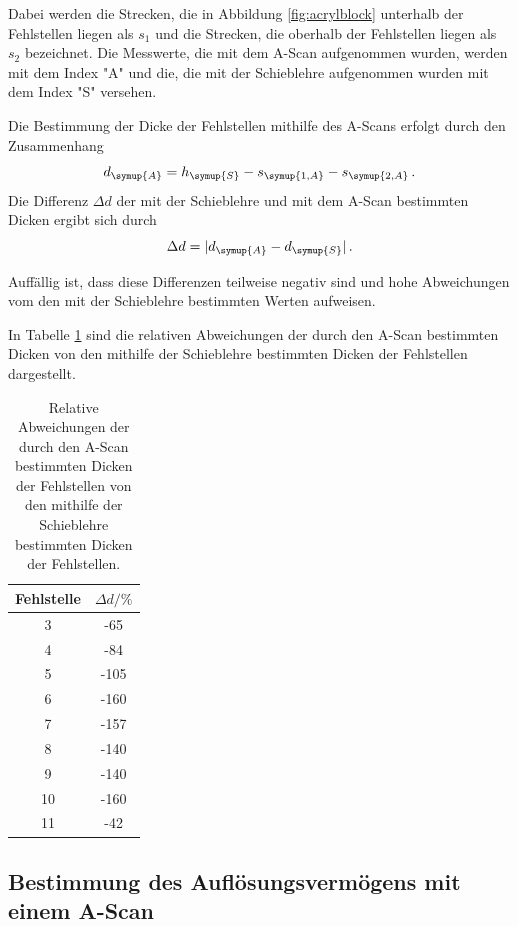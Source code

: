 Dabei werden die Strecken, die in Abbildung \ref{fig:acrylblock} unterhalb der Fehlstellen liegen
als $s_1$ und die Strecken, die oberhalb der Fehlstellen liegen als $s_2$ bezeichnet.
Die Messwerte, die mit dem A-Scan aufgenommen wurden, werden mit dem Index "A"
und die, die mit der Schieblehre aufgenommen wurden mit dem Index "S" versehen.

Die Bestimmung der Dicke der Fehlstellen mithilfe des A-Scans erfolgt durch den
Zusammenhang
\begin{equation}
  d_{\symup{A}}=h_{\symup{S}}-s_{\symup{1,A}}-s_{\symup{2,A}} \,.
\end{equation}
Die Differenz $\Delta d$ der mit der Schieblehre und mit dem A-Scan bestimmten
Dicken ergibt sich durch
\begin{equation}
  \Delta d=|d_{\symup{A}}-d_{\symup{S}}| \,.
\end{equation}

Auffällig ist, dass diese Differenzen teilweise negativ sind und hohe Abweichungen
vom den mit der Schieblehre bestimmten Werten aufweisen.

In Tabelle \ref{tab:abweichunga} sind die relativen Abweichungen der durch den A-Scan
bestimmten Dicken von den mithilfe der Schieblehre bestimmten Dicken der Fehlstellen
dargestellt.

\begin{table}[htp]
	\begin{center}
		\caption{Relative Abweichungen der durch den A-Scan bestimmten Dicken der Fehlstellen
		von den mithilfe der Schieblehre bestimmten Dicken der Fehlstellen.}
		\label{tab:abweichunga}
		\begin{tabular}{cc}
		\toprule
			{Fehlstelle} & {$\Delta d/\%$}\\
			\midrule
			3 & -65\\
			4 & -84\\
			5 & -105\\
			6 & -160\\
			7 & -157\\
			8 & -140\\
			9 & -140\\
			10 & -160\\
			11 & -42\\
		\bottomrule
		\end{tabular}
	\end{center}
\end{table}

\subsection{Bestimmung des Auflösungsvermögens mit einem A-Scan}
\label{subsec:A_scan_auflösung}

